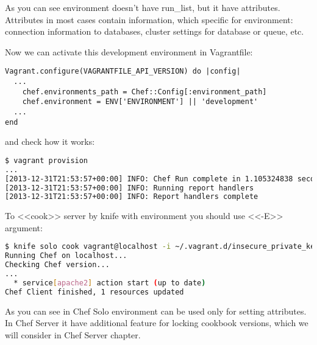As you can see environment doesn't have run\_list, but it have attributes. Attributes in most cases contain information, which specific for environment: connection information to databases, cluster settings for database or queue, etc.

Now we can activate this development environment in Vagrantfile:

\begin{lstlisting}[label=lst:my-cloud-chef-environment2,title=my-cloud/Vagrantfile]
Vagrant.configure(VAGRANTFILE_API_VERSION) do |config|
  ...
    chef.environments_path = Chef::Config[:environment_path]
    chef.environment = ENV['ENVIRONMENT'] || 'development'
  ...
end
\end{lstlisting}

and check how it works:

\begin{lstlisting}[language=Bash,label=lst:my-cloud-chef-environment3]
$ vagrant provision
...
[2013-12-31T21:53:57+00:00] INFO: Chef Run complete in 1.105324838 seconds
[2013-12-31T21:53:57+00:00] INFO: Running report handlers
[2013-12-31T21:53:57+00:00] INFO: Report handlers complete
\end{lstlisting}

To <<cook>> server by knife with environment you should use <<-E>> argument:

\begin{lstlisting}[language=Bash,label=lst:my-cloud-chef-environment4]
$ knife solo cook vagrant@localhost -i ~/.vagrant.d/insecure_private_key -p 2222 -N web1.example.com -E development
Running Chef on localhost...
Checking Chef version...
...
  * service[apache2] action start (up to date)
Chef Client finished, 1 resources updated
\end{lstlisting}

As you can see in Chef Solo environment can be used only for setting attributes. In Chef Server it have additional feature for locking cookbook versions, which we will consider in Chef Server chapter.